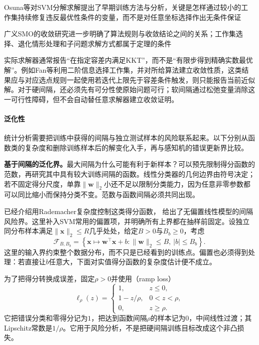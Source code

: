 Osuna等对SVM分解求解提出了早期训练方法与分析，关键是怎样通过较小的工作集持续修复违反最优性条件的变量，而不是对任意坐标选择作出无条件保证

广义SMO的收敛研究进一步明确了算法规则与收敛结论之间的关系；工作集选择、退化情形处理和子问题求解方式都属于定理的条件

实际求解器通常报告“在指定容差内满足KKT”，而不是“有限步得到精确实数最优解”。例如Fan等利用二阶信息选择工作集，并对所给算法建立收敛性质，这类结果应与对应选点规则一起使用若迭代上限先于容差条件触发，则只能报告当前近似解。对于硬间隔，还必须先有可分性使原始问题可行；软间隔通过松弛变量消除这一可行性障碍，但不会自动替任意求解器建立收敛证明。

\paragraph{泛化性}
\label{sec:classification-svm-generalization}

统计分析需要把训练中获得的间隔与独立测试样本的风险联系起来。以下分别从函数类的复杂度和删除训练样本后的解变化入手，再与感知机的错误更新界比较。

\label{sec:classification-svm-margin-generalization}

\textbf{基于间隔的泛化界。}最大间隔为什么可能有利于新样本？可以预先限制得分函数的范数，再研究其中具有较大训练间隔的函数。线性分类器的几何边界由符号决定；若不固定得分尺度，单靠$\lVert\bm{w}\rVert_2$小还不足以限制分类能力，因为任意非零参数都可以同比缩小而保持分类不变。范数与函数间隔必须共同出现。

已经介绍用Rademacher复杂度控制这类得分函数，
给出了无偏置线性模型的间隔风险界。这里补入SVM常用的偏置项，并明确所有上界都在抽样前固定。设独立同分布样本满足$\lVert\bm{x}\rVert_2\le R$几乎处处，给定$B>0$与$B_b\ge0$，考虑
\[
  \mathcal{F}_{B,B_b}
  =\left\{
    \bm{x}\mapsto\bm{w}^{\top}\bm{x}+b:
    \lVert\bm{w}\rVert_2\le B,\ |b|\le B_b
   \right\}.
\]
这里的输入界约束整个数据分布，而不只是已经看到的训练点。偏置也必须得到处理：若直接让$b$任意大，下面对实值得分函数的复杂度估计便不成立。

为了把得分转换成误差，固定$\rho>0$并使用（ramp loss）
\begin{equation}
  \ell_\rho(z)=
  \begin{cases}
    1, & z\le0,\\
    1-z/\rho, & 0<z<\rho,\\
    0, & z\ge\rho.
  \end{cases}
  \label{eq:classification-svm-ramp}
\end{equation}
它把错误分类和零得分记为$1$，把达到函数间隔$\rho$的样本记为$0$，中间线性过渡；其Lipschitz常数是$1/\rho$。它用于风险分析，不是把硬间隔训练目标改成这个非凸损失。

